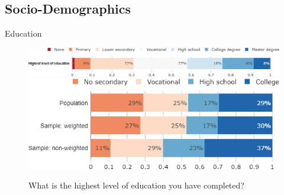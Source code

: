\begin{framefont}{\small}
\subsection{Socio-Demographics}
\begin{frame}{Education}%
    \hspace{.2cm}
\begin{figure}[h!]
\centering
\caption{What is the highest level of education you have completed?}
\includegraphics[width=.78\paperwidth]{../figures/FR/education_FR.png} \\
\vspace{.3cm}
\includegraphics[width=.78\paperwidth]{../figures/FR/diploma_FR_comp.png}
\end{figure}
\end{frame} %



\end{framefont}
